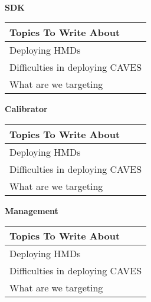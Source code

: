 \filbreak
{} \\

\filbreak
\noindent\textbf{SDK}\\
    \begin{center}
        \begin{table}[H]
            \centering
            \renewcommand\arraystretch{0.5}
            \begin{tabular}{|l|}
                \hline 
                Topics To Write About \\ 
                \hline 
                Deploying HMDs \\  
                Difficulties in deploying CAVES  \\
                What are we targeting \\
                \hline 
            \end{tabular}
        \end{table}
    \end{center}

\filbreak
\noindent\textbf{Calibrator}\\
    \begin{center}
        \begin{table}[H]
            \centering
            \renewcommand\arraystretch{0.5}
            \begin{tabular}{|l|}
                \hline 
                Topics To Write About \\ 
                \hline 
                Deploying HMDs \\  
                Difficulties in deploying CAVES  \\
                What are we targeting \\
                \hline 
            \end{tabular}
        \end{table}
    \end{center}

\filbreak
\noindent\textbf{Management}\\
    \begin{center}
        \begin{table}[H]
            \centering
            \renewcommand\arraystretch{0.5}
            \begin{tabular}{|l|}
                \hline 
                Topics To Write About \\ 
                \hline 
                Deploying HMDs \\  
                Difficulties in deploying CAVES  \\
                What are we targeting \\
                \hline 
            \end{tabular}
        \end{table}
    \end{center}

\clearpage
